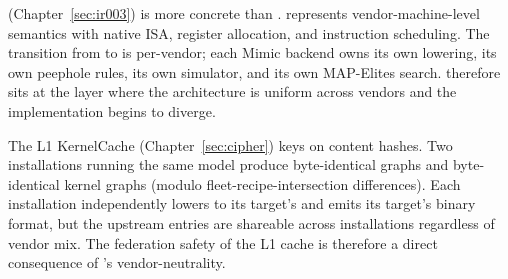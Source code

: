  (Chapter~\ref{sec:ir003}) is more concrete than .
 represents vendor-machine-level semantics with native ISA, register allocation, and instruction scheduling.
The transition from  to  is per-vendor; each Mimic backend owns its own lowering, its own peephole rules, its own simulator, and its own MAP-Elites search.
 therefore sits at the layer where the architecture is uniform across vendors and the implementation begins to diverge.

The L1 KernelCache (Chapter~\ref{sec:cipher}) keys on  content hashes.
Two installations running the same model produce byte-identical  graphs and byte-identical  kernel graphs (modulo fleet-recipe-intersection differences).
Each installation independently lowers  to its target's  and emits its target's binary format, but the upstream  entries are shareable across installations regardless of vendor mix.
The federation safety of the L1 cache is therefore a direct consequence of 's vendor-neutrality.
